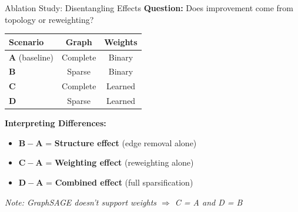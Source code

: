 \documentclass[aspectratio=169]{beamer}
\begin{document}
\begin{frame}[shrink=3]{\faFlask \quad Ablation Study: Disentangling Effects}
    \textbf{\textcolor{cyanneon}{Question:}} Does improvement come from \alert{topology} or \alert{reweighting}?
    
    \vspace{0.1cm}
    \begin{center}\small
    \begin{tabular}{lcc}
        \toprule
        \textbf{\textcolor{lighttext}{Scenario}} & \textbf{\textcolor{lighttext}{Graph}} & \textbf{\textcolor{lighttext}{Weights}} \\
        \midrule
        \textbf{A} (baseline) & Complete & Binary \\
        \textbf{B} & \textcolor{cyanneon}{Sparse} & Binary \\
        \textbf{C} & Complete & \textcolor{violetelectric}{Learned} \\
        \textbf{D} & \textcolor{cyanneon}{Sparse} & \textcolor{violetelectric}{Learned} \\
        \bottomrule
    \end{tabular}
    \end{center}
    
    \vspace{0.1cm}
    \textbf{\textcolor{cyanneon}{\faSearchPlus \quad Interpreting Differences:}}
    \begin{itemize}\setlength{\itemsep}{0pt}
        \item $\mathbf{B - A}$ = \textbf{Structure effect} (edge removal alone)
        \item $\mathbf{C - A}$ = \textbf{Weighting effect} (reweighting alone)
        \item $\mathbf{D - A}$ = \textbf{Combined effect} (full sparsification)
    \end{itemize}
    {\scriptsize \textit{\textcolor{distillgrey}{Note: GraphSAGE doesn't support weights $\Rightarrow$ C = A and D = B}}}
\end{frame}
\end{document}
